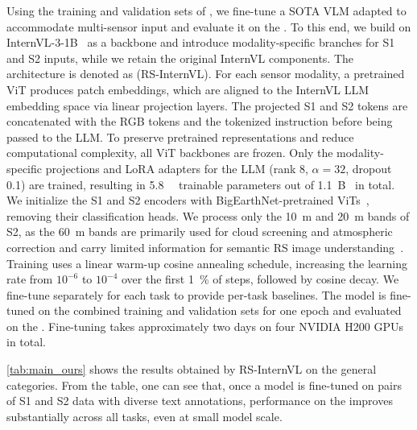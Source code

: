 Using the training and validation sets of \bentxt{}, we fine-tune a \ac{SOTA} \ac{VLM} adapted to accommodate multi-sensor input and evaluate it on the \bench{}. To this end, we build on InternVL-3-1B~\cite{zhu2025internvl3} as a backbone and introduce modality-specific branches for \ac{S1} and \ac{S2} inputs, while we retain the original InternVL components. The architecture is denoted as (\ac{RS}-InternVL). 
For each sensor modality, a pretrained \ac{ViT} produces patch embeddings, which are aligned to the InternVL \ac{LLM} embedding space via linear projection layers.
The projected \ac{S1} and \ac{S2} tokens are concatenated with the \ac{RGB} tokens and the tokenized instruction before being passed to the \ac{LLM}.
To preserve pretrained representations and reduce computational complexity, all \ac{ViT} backbones are frozen. 
Only the modality-specific projections and LoRA adapters for the \ac{LLM} (rank 8, $\alpha=32$, dropout \num{0.1}) are trained, resulting in \SI{5.8}{\mega\nothing} trainable parameters out of \SI{1.1}{\bel\nothing} in total.
We initialize the \ac{S1} and \ac{S2} encoders with BigEarthNet-pretrained \acp{ViT}~\cite{clasen2025reben}, removing their classification heads. 
We process only the \SI{10}{\meter} and \SI{20}{\meter} bands of \ac{S2}, as the \SI{60}{\meter} bands are primarily used for cloud screening and atmospheric correction and carry limited information for semantic \ac{RS} image understanding~\cite{sumbul2021bigearthnet}.
Training uses a linear warm-up cosine annealing schedule, increasing the learning rate from $10^{-6}$ to $10^{-4}$ over the first \SI{1}{\percent} of steps, followed by cosine decay.
We fine-tune separately for each task to provide per-task baselines.
The model is fine-tuned on the combined training and validation sets for one epoch and evaluated on the \bentxt{} \bench{}.
Fine-tuning takes approximately two days on four NVIDIA H200 GPUs in total.

\cref{tab:main_ours} shows the results obtained by RS-InternVL on the general categories.
From the table, one can see that, once a model is fine-tuned on pairs of \ac{S1} and \ac{S2} data with diverse text annotations, performance on the \bench{} improves substantially across all tasks, even at small model scale.
